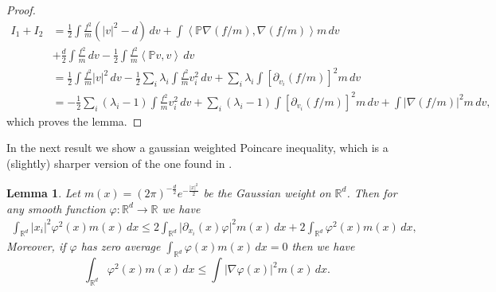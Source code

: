 \documentclass[11pt]{amsart}
\numberwithin{equation}{section}
\def\R{\mathbb{R}}
\newtheorem{lemma}{Lemma}
\begin{document}
\begin{proof}
  \begin{align*}
    I_1 + I_2 & 
    = \frac{1}{2}\int\frac{f^{2}}{ m }\left(\left\vert v \right\vert ^{2}-d\right) \,dv +
    \int\left\langle  \mathbb{P} \nabla(f/ m ),\nabla(f/ m ) \right\rangle  m\,dv \\
    &+ \frac{d}{2}\int\frac{f^{2}}{ m } \,dv -\frac{1}{2}\int\frac{f^{2}}{ m }\left\langle  \mathbb{P} v,v \right\rangle\,dv \\
    & = \frac{1}{2}\int\frac{f^{2}}{ m }\left\vert v \right\vert^{2}\,dv - \frac{1}{2}\sum_i \lambda_i \int \frac{f^2}{m}v_i^2\,dv +
    \sum_i \lambda_i \int \left[\partial_{v_{i}}(f/ m )\right]^{2}m\,dv\\
    & = -\frac{1}{2}\sum_i (\lambda_i - 1)\int \frac{f^2}{m}v_i^2\,dv + 
    \sum_i (\lambda_i - 1) \int \left[\partial_{v_{i}}(f/ m )\right]^{2}m\,dv + \int\vert\nabla\left(f/ m \right)\vert^{2} m\,dv,
  \end{align*}
  which proves the lemma.
\end{proof}
%
%
In the next result we show a gaussian weighted Poincare inequality, which is a (slightly) sharper version of the one found in \cite{Dolb_Volzone}.
% 
\begin{lemma}\label{lem:improved_gauss_poincare}
  Let $m(x)=(2\pi)^{-\frac{d}{2}}e^{-\frac{|x|^2}{2}}$ be the Gaussian weight on $\mathbb{R}^d$. Then for any smooth function $\varphi:\mathbb{R}^d\to\mathbb{R}$ we have
  \begin{align*}
  \int_{\R^d} \vert x_i\vert^2\varphi^2(x) m(x)\,dx  \le {2} \int_{\R^d} \vert \partial_{x_i}(x) \varphi\vert^2m(x)\,dx + 2  \int_{\R^d} \varphi^2(x) m(x)\,dx,
  \end{align*}
  Moreover,  if $\varphi$ has zero average $\int_{\R^d} \varphi(x)m(x)\, dx = 0$ then we have
  \begin{equation*}
    \int_{\R^d} \varphi^2(x) m(x)\,dx   \leq \int \vert \nabla \varphi(x)\vert^2m(x)\,dx.
  \end{equation*}
\end{lemma}
\end{document}
